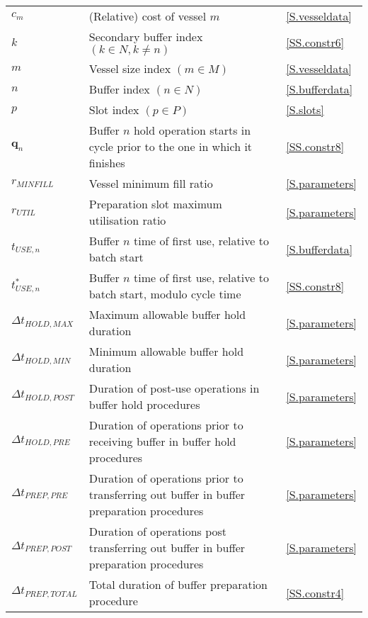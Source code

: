 {\begin{longtabu} to 
     &  & \\\hline
    \endhead
    $c_{m}$ & (Relative) cost of vessel $m$ & \ref{S.vesseldata}\\
    $k$ & Secondary buffer index $\left( k \in N, k \ne n \right)$
        & \ref{SS.constr6}\\
    $m$ & Vessel size index $\left( m \in M \right)$ & \ref{S.vesseldata}\\
    $n$ & Buffer index $\left( n \in N \right)$ & \ref{S.bufferdata}\\
    $p$ & Slot index $\left( p \in P \right)$ & \ref{S.slots}\\
    $\boldsymbol{q}_{n}$ & Buffer $n$ hold operation starts in cycle prior to
        the one in which it finishes & \ref{SS.constr8}\\
    $r_{MINFILL}$ & Vessel minimum fill ratio & \ref{S.parameters}\\
    $r_{UTIL}$ & Preparation slot maximum utilisation ratio
        & \ref{S.parameters}\\
    $t_{USE,n}$ & Buffer $n$ time of first use, relative to batch start
        & \ref{S.bufferdata}\\
    $t_{USE,n}^{*}$ & Buffer $n$ time of first use, relative to batch
        start, modulo cycle time & \ref{SS.constr8}\\
    $\Delta t_{HOLD,MAX}$ & Maximum allowable buffer hold duration
        & \ref{S.parameters}\\
    $\Delta t_{HOLD,MIN}$ & Minimum allowable buffer hold duration
        & \ref{S.parameters}\\
    $\Delta t_{HOLD,POST}$ & Duration of post-use operations in buffer hold
        procedures & \ref{S.parameters}\\
    $\Delta t_{HOLD,PRE}$ & Duration of operations prior to receiving buffer in
        buffer hold procedures & \ref{S.parameters}\\
    $\Delta t_{PREP,PRE}$ & Duration of operations prior to transferring out
        buffer in buffer preparation procedures & \ref{S.parameters}\\
    $\Delta t_{PREP,POST}$ & Duration of operations post transferring out
        buffer in buffer preparation procedures & \ref{S.parameters}\\
    $\Delta t_{PREP,TOTAL}$ & Total duration of buffer preparation procedure
        & \ref{SS.constr4}\\

\end{longtabu}}
